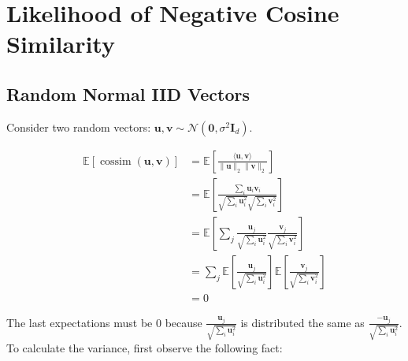 




\section{Likelihood of Negative Cosine Similarity}

\subsection{Random Normal IID Vectors}
\label{appendix:random_normal_iid_vectors}
Consider two random vectors: $\mathbf{u}, \mathbf{v} \sim \mathcal{N}(\mathbf{0}, \sigma^2 \mathbf{I}_d)$.

\begin{align*}
\mathbb{E}[\operatorname{cossim}(\mathbf{u}, \mathbf{v})] &= \mathbb{E}\left[\frac{\langle \mathbf{u}, \mathbf{v} \rangle}{\|\mathbf{u}\|_2 \|\mathbf{v}\|_2}\right]\\
&= \mathbb{E}\left[ \frac{\sum_i \mathbf{u}_{i} \mathbf{v}_{i}}{\sqrt{\sum_i \mathbf{u}_i^2} \sqrt{\sum_i \mathbf{v}_i^2}} \right]\\
&= \mathbb{E}\left[ \sum_j \frac{\mathbf{u}_j}{\sqrt{\sum_i \mathbf{u}_i^2}} \frac{\mathbf{v}_j}{\sqrt{\sum_i \mathbf{v}_i^2}} \right]\\
&= \sum_j \mathbb{E}\left[ \frac{\mathbf{u}_j}{\sqrt{\sum_i \mathbf{u}_i^2}} \right] \mathbb{E}\left[ \frac{\mathbf{v}_j}{\sqrt{\sum_i \mathbf{v}_i^2}}\right]\\
&= 0
\end{align*}

The last expectations must be 0 because $\frac{\mathbf{u}_j}{\sqrt{\sum_i \mathbf{u}_i^2}}$ is distributed the same as $\frac{-\mathbf{u}_j}{\sqrt{\sum_i \mathbf{u}_i^2}}$. To calculate the variance, first observe the following fact:

